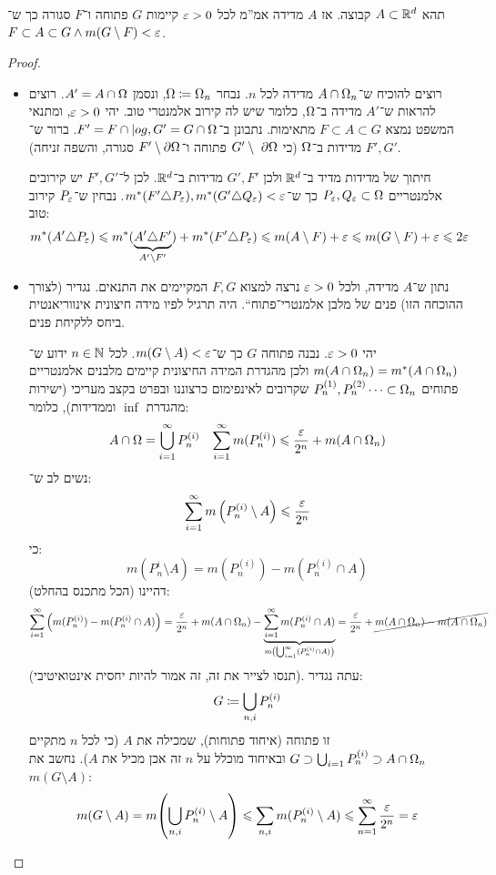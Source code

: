 \documentclass[name=רשימות פונקציות ממשיות – WIP]{../../../tex/classes/noChapterMegasumPreamble}
\begin{document}
	\begin{Theorem}
		תהא $A \subset \mathbb{R}^{d}$ קבוצה. אז $A$ מדידה אמ''מ לכל $\eg > 0$ קיימות $G$ פתוחה ו־$F$ סגורה כך ש־$F \subset A \subset G \land m(G \setminus F) < \eg$. 
	\end{Theorem}\begin{proof}
		\begin{itemize}
			\item[$\implies$] רוצים להוכיח ש־$A \cap \Omega_n$ מדידה לכל $n$. נבחר $\Omega \coloneqq \Omega_n$, ונסמן $A' = A \cap \Omega$. רוצים להראות ש־$A'$ מדידה ב־$\Omega$, כלומר שיש לה קירוב אלמנטרי טוב. יהי $\eg > 0$, ומתנאי המשפט נמצא $F \subset A \subset G$ מתאימות. נתבונן ב־$F' = F \cap |og, G' = G \cap \Omega$. ברור ש־$F', G'$ מדידות ב־$\Omega$ (כי $G' \setminus \ \partial \Omega$ פתוחה ו־$F' \setminus \partial \Omega $ סגורה, והשפה זניחה). 
			
			חיתוך של מדידות מדיד ב־$\mathbb{R}^{d}$ ולכן $G', F'$ מדידות ב־$\mathbb{R}^{d}$. לכן ל־$F', G'$ יש קירובים אלמנטריים $P_\eg, Q_\eg \subset \Og$ כך ש־$m^*(F' \trio P_\eg) ,m^*(G' \trio Q_\eg) < \eg$. נבחין ש־$P_\eg$ קירוב טוב: 
			\[ m^*(A' \trio P_\eg) \le m^*(\underbrace{A' \trio F'}_{A' \setminus F'}) + m^*(F' \trio P_\eg) \le m(A \setminus F) + \eg \le m(G \setminus F) + \eg \le 2\eg \]
			\item[$\impliedby$]נתון ש־$A$ מדידה, ולכל $\eg > 0$ נרצה למצוא $F, G$ המקיימים את התנאים. נגדיר (לצורך ההוכחה הזו) פנים של מלבן אלמנטרי־פתוח``. היה תרגיל לפיו מידה חיצונית אינווריאנטית ביחס ללקיחת פנים. 
			
			יהי $\eg > 0$. נבנה פתוחה $G$ כך ש־$m(G \setminus A) < \eg$. לכל $n \in \mathbb{N}$ ידוע ש־$m(A \cap \Omega_n) = m^*(A \cap \Omega_n)$ ולכן מהגדרת המידה החיצונית קיימים מלבנים אלמנטריים פתוחים $P_{n}^{(1)}, P_{n}^{(2)} \dots \subset \Omega_n$ שקרובים לאינפימום כרצוננו ובפרט בקצב מעריכי (ישירות מהגדרת $\inf$ וממדידות), כלומר:
			\begin{align*}
				A \cap \Og = \bigcup_{i = 1}^{\infty}P_n^{(i)} && \sum_{i = 1}^{\infty}m(P_{n}^{(i)}) \le \frac{\eg}{2^{n}} + m(A \cap \Og_n)
			\end{align*}
			נשים לב ש־: 
			\[ \sum_{i = 1}^{\infty}m\cl{P_n^{(i)} \setminus A} \le \frac{\eg}{2^{n}} \]
			כי: 
			\[ m(P_{n}^{i} \setminus A) = m(P_n^{(i)}) - m(P_n^{(i)} \cap A) \]
			(הכל מתכנס בהחלט) דהיינו: 
			\[ \sum_{i = 1}^{\infty} \cl{m(P_n^{(i)}) - m(P_n^{(i)} \cap A)} = \frac{\eg}{2^{n}} + m(A \cap \Og_n) - \underbrace{\sum_{i = 1}^{\infty}m(P_n^{(i)} \cap A)}_{\mathclap{m\cl{\bigcup^{\infty}_{i = 1}(P_n^{(i)}\cap A)}}} = \frac{\eg}{2^{n}} + \cancel{m(A \cap \Og_n) - m(A \cap \Og_n)} \]
			(תנסו לצייר את זה, זה אמור להיות יחסית אינטואיטיבי). 
			עתה נגדיר: 
			\[ G \coloneqq \bigcup_{n, i}P_n^{(i)} \]
			זו פתוחה (איחוד פתוחות), שמכילה את $A$ (כי לכל $n$ מתקיים $G \supset \bigcup_{i = 1} P_n^{(i)} \supset A \cap \Omega_n$ ובאיחוד מוכלל על $n$ זה אכן מכיל את $A$). נחשב את $m(G \setminus A)$: 
			\[ m(G \setminus A) = m\!\cl{\bigcup_{n, i}P_n^{(i)}\setminus A} \le \sum_{n, i}m(P_n^{(i)}\setminus A) \le \sum_{n =1}^{\infty}\frac{\eg}{2^{n}} = \eg \]
			

\end{itemize}
\end{proof}
\end{document}
